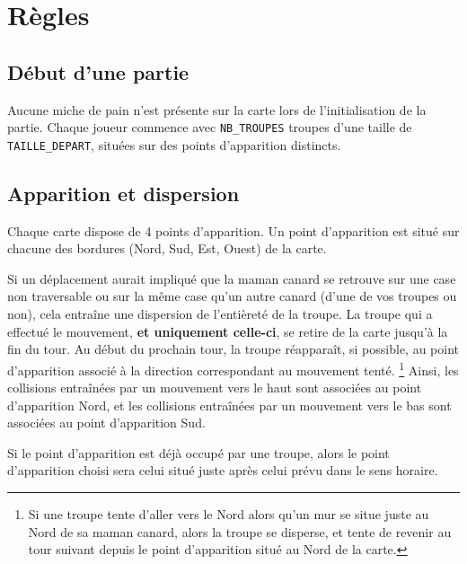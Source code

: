 \section{Règles} 

\subsection{Début d'une partie}


Aucune miche de pain n'est présente sur la carte lors de l'initialisation de 
la partie.
Chaque joueur commence avec \texttt{NB\_TROUPES} troupes d'une taille de
\texttt{TAILLE\_DEPART}, situées sur des points d'apparition distincts.

\subsection{Apparition et dispersion}

Chaque carte dispose de 4 points d'apparition. Un point d'apparition est
situé sur chacune des bordures (Nord, Sud, Est, Ouest) de la carte.




Si un déplacement aurait impliqué que la maman canard se retrouve sur une case non
traversable ou sur la même case qu'un autre canard (d'une de vos troupes ou non),
cela entraîne une dispersion de l'entièreté de la troupe. La troupe qui a effectué le
mouvement, \textbf{et uniquement celle-ci}, se retire de la carte jusqu'à la fin du tour.
Au début du prochain tour, la troupe réapparaît, si possible,
au point d'apparition associé à la direction correspondant au mouvement tenté.
\footnote{Si une troupe tente d'aller vers le Nord alors qu'un mur se situe juste au Nord de sa
maman canard, alors la troupe se disperse, et tente de revenir au tour suivant depuis le
point d'apparition situé au Nord de la carte.}
Ainsi, les collisions entraînées par un mouvement vers le haut sont associées au point
d'apparition Nord, et les collisions entraînées par un mouvement vers le bas sont
associées au point d'apparition Sud.

Si le point d'apparition est déjà occupé par une troupe, alors le point d'apparition
choisi sera celui situé juste après celui prévu dans le sens horaire.


